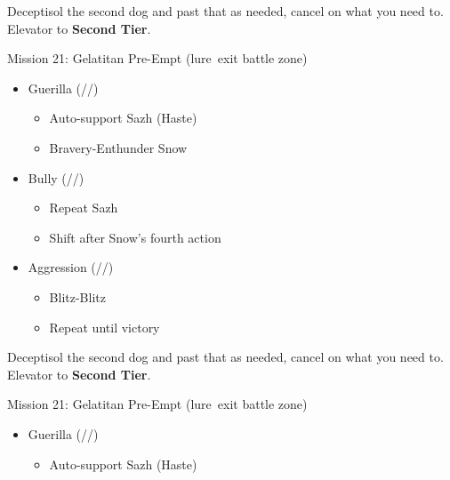 \begin{paracol}{2}
	\renewcommand{\first}{[1] Guerilla (\syn/\sab/\rav)}
	\renewcommand{\second}{[2] Devastation (\com/\sab/\com)}
	\renewcommand{\third}{[3] Hero's Charge (\syn/\med/\com)}
	\renewcommand{\fourth}{[4] Tireless Charge (\com/\med/\com)}
	\renewcommand{\fifth}{[5] Bully (\syn/\sab/\com)}
	\renewcommand{\sixth}{[6] Aggression (\com/\rav/\com)}
	Deceptisol the second dog and past that as needed, cancel on what you need to.
	Elevator to \textbf{Second Tier}.
	\begin{battle}{Mission 21: Gelatitan Pre-Empt (lure\, exit battle zone)}
		\begin{itemize}
			\item \first
			      \begin{itemize}
				      \item Auto-support Sazh (Haste)
				      \item Bravery-Enthunder Snow
			      \end{itemize}
			\item \fifth
			      \begin{itemize}
				      \item Repeat Sazh
				      \item Shift after Snow's fourth action
			      \end{itemize}
			\item \sixth
			      \begin{itemize}
				      \item Blitz-Blitz
				      \item Repeat until victory
			      \end{itemize}
		\end{itemize}
		\itemdrop{0.3}{Aegisol}
	\end{battle}
	\switchcolumn
	Deceptisol the second dog and past that as needed, cancel on what you need to.
	Elevator to \textbf{Second Tier}.
	\renewcommand{\first}{[1] Guerilla (\syn/\sab/\rav)}
	\renewcommand{\second}{[2] Tireless Charge (\com/\med/\com)}
	\renewcommand{\third}{[3] Hero's Charge (\syn/\med/\com)}
	\renewcommand{\fourth}{[4] Devastation (\com/\sab/\com)}
	\renewcommand{\fifth}{[5] Bully (\syn/\sab/\com)}
	\renewcommand{\sixth}{[6] Aggression (\com/\rav/\com)}
	\begin{battle}{Mission 21: Gelatitan Pre-Empt (lure\, exit battle zone)}
		\begin{itemize}
			\item \first
			      \begin{itemize}
				      \item Auto-support Sazh (Haste)

\end{itemize}
\end{itemize}
\end{battle}
\end{paracol}
